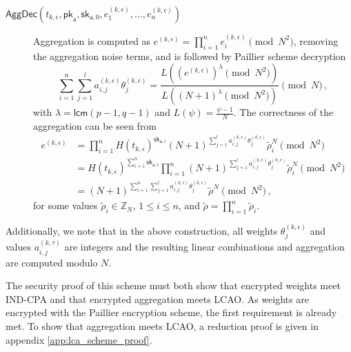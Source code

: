 \begin{description}
    \item[$\mathsf{AggDec}(t_{k,\epsilon}, \mathsf{pk}_{\mathsf{a}}, \mathsf{sk}_{\mathsf{a},0}, e^{(k,\epsilon)}_1,\dots,e^{(k,\epsilon)}_n)$] Aggregation is computed as $e^{(k,\epsilon)} = \prod^n_{i=1}e^{(k,\epsilon)}_i\pmod{N^2}$, removing the aggregation noise terms, and is followed by Paillier scheme decryption
    \begin{equation}\label{eq:nonlin_fusion:lca_scheme_decryption}
        \sum^{n}_{i=1}\sum^{l}_{j=1} a^{(k,\epsilon)}_{i,j}\theta^{(k,\epsilon)}_j = \frac{L((e^{(k,\epsilon)})^\lambda\pmod{N^2})}{L((N+1)^\lambda\pmod{N^2})} \pmod{N}\,,
    \end{equation}
    with $\lambda = \mathsf{lcm}(p-1, q-1)$ and $L(\psi) = \frac{\psi-1}{N}$. The correctness of the aggregation can be seen from
    \begin{align*}
        e^{(k,\epsilon)} &= \prod^n_{i=1}H(t_{k,\epsilon})^{\mathsf{sk}_{\mathsf{a},i}}(N+1)^{\sum^{l}_{j=1}a^{(k,\epsilon)}_{i,j}\theta^{(k,\epsilon)}_j}\tilde{\rho}_i^N \pmod{N^2}\\
        &= H(t_{k,\epsilon})^{\sum^n_{i=1}\mathsf{sk}_{\mathsf{a},i}}\prod^n_{i=1}(N+1)^{\sum^{l}_{j=1}a^{(k,\epsilon)}_{i,j}\theta^{(k,\epsilon)}_j}\tilde{\rho}_i^N \pmod{N^2}\\
        &= (N+1)^{\sum^n_{i=1}\sum^{l}_{j=1}a^{(k,\epsilon)}_{i,j}\theta^{(k,\epsilon)}_j}\tilde{\rho}^N\pmod{N^2}\,,
    \end{align*}
    for some values $\tilde{\rho}_i \in \mathbb{Z}_N$, $1\leq i\leq n$, and $\tilde{\rho}=\prod^{n}_{i=1}\tilde{\rho}_i$.
\end{description}
Additionally, we note that in the above construction, all weights $\theta^{(k,\epsilon)}_j$ and values $a^{(k,\tau)}_{i,j}$ are integers and the resulting linear combinations and aggregation are computed modulo $N$. 

The security proof of this scheme must both show that encrypted weights meet IND-CPA and that encrypted aggregation meets LCAO. As weights are encrypted with the Paillier encryption scheme, the first requirement is already met. To show that aggregation meets LCAO, a reduction proof is given in appendix \ref{app:lca_scheme_proof}.


